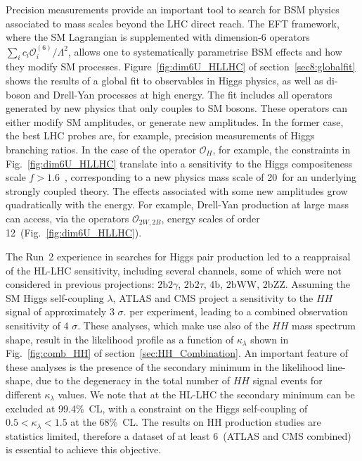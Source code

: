 \documentclass[../report.tex]{subfiles}
\begin{document}
Precision measurements provide an important tool to search for BSM physics associated to mass scales beyond the LHC direct reach. The EFT framework, where the SM Lagrangian is supplemented with dimension-6 operators $\sum_{i} c_i \mathcal{O}^{(6)}_i/\Lambda^2$, allows one to systematically parametrise BSM effects and how they modify SM processes. Figure~\ref{fig:dim6U_HLLHC} of section~\ref{sec8:globalfit} shows the results of a global fit  to observables in Higgs physics, as well as di-boson and Drell-Yan processes at high energy. The fit includes all operators generated by new physics that only couples to SM bosons. These operators can either modify SM amplitudes, or generate new amplitudes. In the former case, the best LHC probes are, for example, precision measurements of Higgs branching ratios. In the case of the operator $\mathcal{O}_H$, 
for example, the constraints in Fig.~\ref{fig:dim6U_HLLHC} translate into a sensitivity to the Higgs compositeness scale $f>1.6$~\UTeV, corresponding to a new physics mass scale of 20~\UTeV for an underlying strongly coupled theory.
The effects associated with some new amplitudes grow quadratically with the energy. For example, Drell-Yan production at large mass can access, via the operators $\mathcal{O}_{2W,2B}$, energy scales of order 12~\UTeV (Fig.~\ref{fig:dim6U_HLLHC}). 

The Run~2 experience in searches for Higgs pair production led to a reappraisal of the HL-LHC sensitivity, including several channels, some of which were not considered in previous projections: $2\textrm{b}2\gamma$, $2\textrm{b}2\tau$, $4\textrm{b}$, $2\textrm{b}\textrm{WW}$, $2\textrm{b}\textrm{ZZ}$.
Assuming the SM Higgs self-coupling $\lambda$, ATLAS and CMS project a sensitivity to the $HH$ signal of approximately 3 $\sigma$. per experiment, leading to a combined observation sensitivity of 4 $\sigma$. These analyses, which make use also of the $HH$ mass spectrum shape, result in the likelihood profile as a function of $\kappa_{\lambda}$ shown in Fig.~\ref{fig:comb_HH} of section~\ref{sec:HH_Combination}. An important feature of these analyses is the presence of the secondary minimum in the likelihood line-shape, due to the degeneracy in the total number of $HH$ signal events for different $\kappa_{\lambda}$ values. We note that at the HL-LHC the secondary minimum can be excluded at 99.4\%~CL, with a constraint on the Higgs self-coupling of $0.5 < \kappa_{\lambda} < 1.5 $ at the 68\%\ CL. The results on HH production studies are statistics limited, therefore a dataset of at least 6\,\iab{}  (ATLAS and CMS combined) is essential to achieve this objective.
\end{document}
